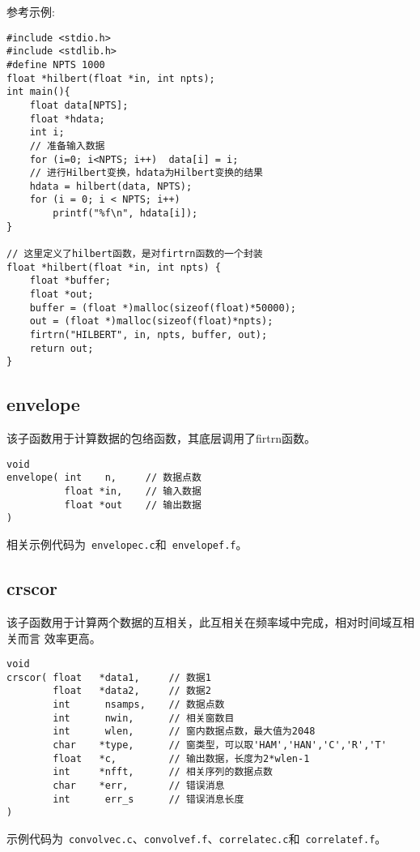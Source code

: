 参考示例:
\begin{verbatim}
#include <stdio.h>
#include <stdlib.h>
#define NPTS 1000
float *hilbert(float *in, int npts);
int main(){
    float data[NPTS];
    float *hdata;
    int i;
    // 准备输入数据
    for (i=0; i<NPTS; i++)  data[i] = i;
    // 进行Hilbert变换，hdata为Hilbert变换的结果
    hdata = hilbert(data, NPTS);
    for (i = 0; i < NPTS; i++)
        printf("%f\n", hdata[i]);
}

// 这里定义了hilbert函数，是对firtrn函数的一个封装
float *hilbert(float *in, int npts) {
    float *buffer;
    float *out;
    buffer = (float *)malloc(sizeof(float)*50000);
    out = (float *)malloc(sizeof(float)*npts);
    firtrn("HILBERT", in, npts, buffer, out);
    return out;
}
\end{verbatim}

\subsection{envelope}
该子函数用于计算数据的包络函数，其底层调用了firtrn函数。
\begin{verbatim}
void
envelope( int    n,     // 数据点数
          float *in,    // 输入数据
          float *out    // 输出数据
)
\end{verbatim}

相关示例代码为~\verb+envelopec.c+和~\verb+envelopef.f+。

\subsection{crscor}
该子函数用于计算两个数据的互相关，此互相关在频率域中完成，相对时间域互相关而言
效率更高。

\begin{verbatim}
void
crscor( float   *data1,     // 数据1
        float   *data2,     // 数据2
        int      nsamps,    // 数据点数
        int      nwin,      // 相关窗数目
        int      wlen,      // 窗内数据点数，最大值为2048
        char    *type,      // 窗类型，可以取'HAM','HAN','C','R','T'
        float   *c,         // 输出数据，长度为2*wlen-1
        int     *nfft,      // 相关序列的数据点数
        char    *err,       // 错误消息
        int      err_s      // 错误消息长度
)
\end{verbatim}

示例代码为~\verb+convolvec.c+、\verb+convolvef.f+、\verb+correlatec.c+和~\verb+correlatef.f+。
